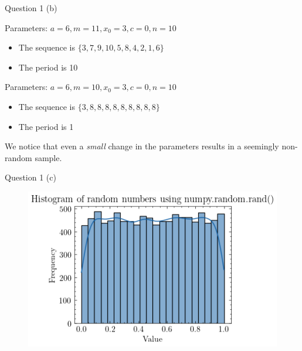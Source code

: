 \documentclass[compress,12pt]{beamer}
\begin{document}
\begin{frame}{Question 1 (b)}

      Parameters: $a = 6, m = 11, x_0 = 3, c = 0,
      n=10$
      \begin{itemize}
            \item The sequence is $\{3, 7, 9, 10, 5, 8, 4, 2, 1, 6\}$
            \item The period is 10
      \end{itemize}

      Parameters: $a = 6, m = 10, x_0 = 3, c = 0, 
      n=10$
      \begin{itemize}
            \item The sequence is $\{3, 8, 8, 8, 8, 8, 8, 8, 8, 8\}$
            \item The period is 1
      \end{itemize}
    \begin{tcolorbox}
    We notice that even a \emph{small} change in the parameters results in a seemingly non-random sample.
      \end{tcolorbox}
\end{frame}

\begin{frame}{Question 1 (c)}
      \begin{figure}
            \centering
            \includegraphics[scale=0.7]{imgs/1d.png}
      \end{figure}
\end{frame}
\end{document}
